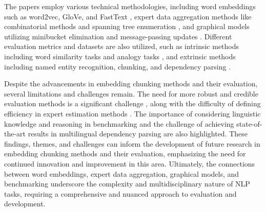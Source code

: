 \documentclass[conference]{IEEEtran}
\begin{document}
The papers employ various technical methodologies, including word embeddings such as word2vec, GloVe, and FastText \cite{b1, b5}, expert data aggregation methods like combinatorial methods and spanning tree enumeration \cite{b2}, and graphical models utilizing minibucket elimination and message-passing updates \cite{b3}. Different evaluation metrics and datasets are also utilized, such as intrinsic methods including word similarity tasks and analogy tasks \cite{b1}, and extrinsic methods including named entity recognition, chunking, and dependency parsing \cite{b1, b5}.

Despite the advancements in embedding chunking methods and their evaluation, several limitations and challenges remain. The need for more robust and credible evaluation methods is a significant challenge \cite{b1, b2}, along with the difficulty of defining efficiency in expert estimation methods \cite{b2}. The importance of considering linguistic knowledge and reasoning in benchmarking \cite{b4} and the challenge of achieving state-of-the-art results in multilingual dependency parsing \cite{b5} are also highlighted. These findings, themes, and challenges can inform the development of future research in embedding chunking methods and their evaluation, emphasizing the need for continued innovation and improvement in this area. Ultimately, the connections between word embeddings, expert data aggregation, graphical models, and benchmarking underscore the complexity and multidisciplinary nature of NLP tasks, requiring a comprehensive and nuanced approach to evaluation and development.
\end{document}
